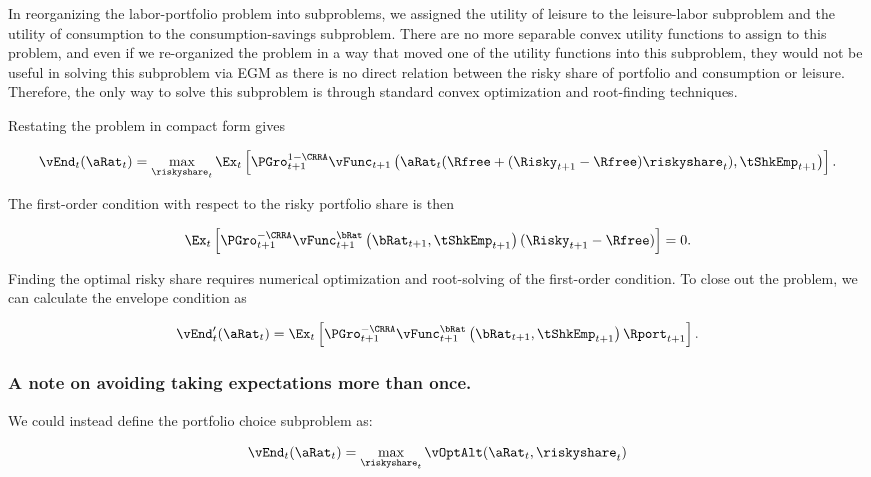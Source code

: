 \documentclass[\econtexRoot/SequentialEGM]{subfiles}
\begin{document}
In reorganizing the labor-portfolio problem into subproblems, we assigned the utility of leisure to the leisure-labor subproblem and the utility of consumption to the consumption-savings subproblem. There are no more separable convex utility functions to assign to this problem, and even if we re-organized the problem in a way that moved one of the utility functions into this subproblem, they would not be useful in solving this subproblem via EGM as there is no direct relation between the risky share of portfolio and consumption or leisure. Therefore, the only way to solve this subproblem is through standard convex optimization and root-finding techniques.

Restating the problem in compact form gives

\begin{equation}
  \vEnd_{t}(\aRat_{t}) = \max_{\riskyshare_{t}}  \Ex_{t} \left[ \PGro_{t+1}^{1-\CRRA}
  \vFunc_{t+1}\left(\aRat_{t}(\Rfree + (\Risky_{t+1} - \Rfree) \riskyshare_{t}), \tShkEmp_{t+1}\right)
  \right].
\end{equation}

The first-order condition with respect to the risky portfolio share is then

\begin{equation}
  \Ex_{t} \left[ \PGro_{t+1}^{-\CRRA} \vFunc_{t+1}^{\bRat}\left(\bRat_{t+1}, \tShkEmp_{t+1}\right) (\Risky_{t+1} - \Rfree)  \right] = 0.
\end{equation}

Finding the optimal risky share requires numerical optimization and root-solving of the first-order condition. To close out the problem, we can calculate the envelope condition as

\begin{equation}
  \vEnd_{t}'(\aRat_{t}) =  \Ex_{t} \left[ \PGro_{t+1}^{-\CRRA} \vFunc_{t+1}^{\bRat}\left(\bRat_{t+1}, \tShkEmp_{t+1}\right) \Rport_{t+1}  \right].
\end{equation}

\subsubsection{A note on avoiding taking expectations more than once.}

We could instead define the portfolio choice subproblem as:

\begin{equation}
  \vEnd_{t}(\aRat_{t}) = \max_{\riskyshare_{t}} \vOptAlt(\aRat_{t}, \riskyshare_{t})
\end{equation}
\end{document}

